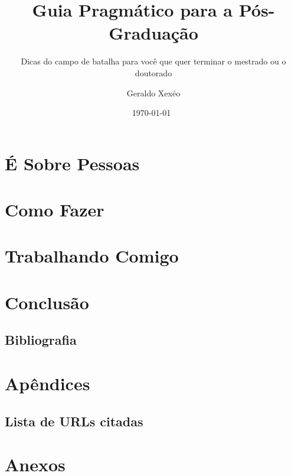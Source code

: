 \documentclass[fontsize=12pt,open=any,DIV=12,  BCOR=0mm,  headings=normal,   a4paper,pagesize=auto,toc=listof,twoside=false,chapterprefix=false,appendixprefix=true]{scrbook}
\title{Guia Pragmático para a Pós-Graduação}
\subtitle{Dicas do campo de batalha para você que quer terminar o mestrado ou o doutorado}
\author{Geraldo Xexéo}
\date{\today~\currenttime}
\begin{document}


\clearpage
\maketitle






\pagestyle{plain}
\frontmatter
\tableofcontents
\listoffigures
\listoftables

\mainmatter
\pagestyle{headings}


\part{É Sobre Pessoas}







\part{Como Fazer}







%

\part{Trabalhando Comigo}


\part{Conclusão}

\chapter{Bibliografia}
\printbibliography[heading=none]  %
\part{Apêndices}
\renewcommand{\chapapp}{Apêndice}
\renewcommand{\thechapter}{\Alph{chapter}}
\setcounter{chapter}{0}


\chapter{Lista de URLs citadas}
  \immediate\closeout\urllistfile
\part{Anexos}
\renewcommand{\chapapp}{Anexo}
\renewcommand{\thechapter}{\Alph{chapter}}
\setcounter{chapter}{0}



\listofurls



%
\end{document}
